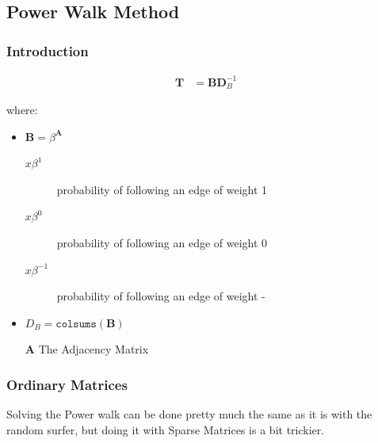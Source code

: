\documentclass[11pt]{article}
\begin{document}
\subsection{Power Walk Method}
\label{sec:org3c07073}
\subsubsection{Introduction}
\label{sec:orgb91f512}

\begin{align}
\mathbf{T} &= \mathbf{B} \mathbf{D}^{-1}_{B} \label{eq:pwalk-def}
\end{align}



where:

\begin{itemize}
\item \(\mathbf{B}= \beta^{\mathbf{A}}\)
\begin{description}
\item[{\(x\beta^{1}\) }] probability of following an edge of weight 1
\item[{\(x\beta^{0}\) }] probability of following an edge of weight 0
\item[{\(x\beta^{-1}\)}] probability of following an edge of weight -
\end{description}
\item \(D_{B} = \mathtt{colsums}(\mathbf{B})\)
\item[{\(\mathbf{A}\)}] The Adjacency Matrix
\end{itemize}

\subsubsection{Ordinary Matrices}
\label{sec:orgeb9cac8}
Solving the Power walk can be done pretty much the same as it is with the random surfer, but doing it with Sparse Matrices is a bit trickier.
\end{document}
